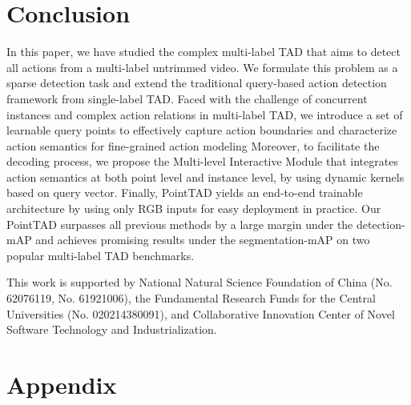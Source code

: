 \documentclass{article}
\begin{document}
\vspace{-0.5em}
\section{Conclusion}
\vspace{-0.5em}
In this paper, we have studied the complex multi-label TAD that aims to detect all actions from a multi-label untrimmed video. We formulate this problem as a sparse detection task and extend the traditional query-based action detection framework from single-label TAD. Faced with the challenge of concurrent instances and complex action relations in multi-label TAD, we introduce a set of learnable query points to effectively capture action boundaries and characterize action semantics for fine-grained action modeling Moreover, to facilitate the decoding process, we propose the Multi-level Interactive Module that integrates action semantics at both point level and instance level, by using dynamic kernels based on query vector. Finally, PointTAD yields an end-to-end trainable architecture by using only RGB inputs for easy deployment in practice. Our PointTAD surpasses all previous methods by a large margin under the detection-mAP and achieves promising results under the segmentation-mAP on two popular multi-label TAD benchmarks. 

\begin{ack}
{This work is supported by National Natural Science Foundation of China (No. 62076119, No. 61921006), the Fundamental Research Funds for the Central Universities (No. 020214380091), and Collaborative Innovation Center of Novel Software Technology and Industrialization.}
\end{ack}


{\small


}

\clearpage

\newpage

\appendix

\section{Appendix}
\end{document}

